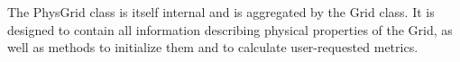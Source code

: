 %



The PhysGrid class is itself internal and is aggregated by the Grid
class.  It is designed to contain all information describing physical
properties of the Grid, as well as methods to initialize them and to
calculate user-requested metrics.

